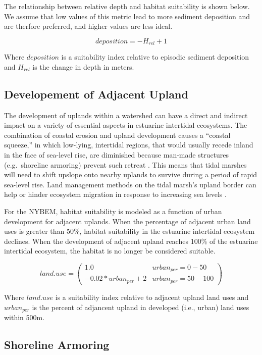 \documentclass[
]{book}
\begin{document}
The relationship between relative depth and habitat suitability is shown below. We assume that low values of this metric lead to more sediment deposition and are therfore preferred, and higher values are less ideal.

\[deposition = -H_{rel}+1\]

Where \(deposition\) is a suitability index relative to episodic sediment deposition and \(H_{rel}\) is the change in depth in meters.

\hypertarget{developement-of-adjacent-upland}{%
\subsection{Developement of Adjacent Upland}\label{developement-of-adjacent-upland}}

The development of uplands within a watershed can have a direct and indirect impact on a variety of essential aspects in estuarine intertidal ecosystems. The combination of coastal erosion and upland development causes a ``coastal squeeze,'' in which low-lying, intertidal regions, that would usually recede inland in the face of sea-level rise, are diminished because man-made structures (e.g.~shoreline armoring) prevent such retreat \citep{prosser_impacts_2018}. This means that tidal marshes will need to shift upslope onto nearby uplands to survive during a period of rapid sea-level rise. Land management methods on the tidal marsh's upland border can help or hinder ecosystem migration in response to increasing sea levels \citep{anisfeld_upslope_2017}.

For the NYBEM, habitat suitability is modeled as a function of urban development for adjacent uplands. When the percentage of adjacent urban land uses is greater than 50\%, habitat suitability in the estuarine intertidal ecosystem declines. When the development of adjacent upland reaches 100\% of the estuarine intertidal ecosystem, the habitat is no longer be considered suitable.

\[land.use = \begin{pmatrix} 1.0 & urban_{per}=0-50\\
-0.02*urban_{per}+2 & urban_{per}=50-100
\end{pmatrix}\]

Where \(land.use\) is a suitability index relative to adjacent upland land uses and \(urban_{per}\) is the percent of adjancent upland in developed (i.e., urban) land uses within 500m.

\hypertarget{shoreline-armoring}{%
\subsection{Shoreline Armoring}\label{shoreline-armoring}}
\end{document}
